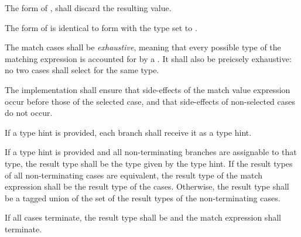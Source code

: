 \specsubsubitem
The \terminal{\_} form of , shall discard the resulting value.

\specsubsubitem
The  form of  is identical to
\terminal{\_} \terminal{:}  form with the type set to
.

\specsubsubitem
The match cases shall be \textit{exhaustive}, meaning that every possible type
of the matching expression is accounted for by a . It
shall also be preicsely exhaustive: no two cases shall select for the same
type.

\specsubsubitem
The implementation shall ensure that side-effects of the match value
expression occur before those of the selected case, and that side-effects of
non-selected cases do not occur.

\specsubsubitem
If a type hint is provided, each branch shall receive it as a type hint.

\specsubsubitem
If a type hint is provided and all non-terminating branches are assignable to
that type, the result type shall be the type given by the type hint. If the
result types of all non-terminating cases are equivalent, the result type of
the match expression shall be the result type of the cases. Otherwise, the
result type shall be a tagged union of the set of the result types of the
non-terminating cases.

If all cases terminate, the result type shall be  and the match
expression shall terminate.


\begin{grammar}
 \\
	   \\
	\terminal{*}    \\
	 \terminal{=}  \\

 \oneof \\
	\terminal{=}
	\terminal{+=}
	\terminal{-=}
	\terminal{*=}
	\terminal{/=}
	\terminal{\%=}
	\terminal{\textless{}\textless{}=}
	\terminal{\textgreater{}\textgreater{}=}
	\terminal{\&=}
	\terminal{|=}
	\terminal{\textasciicircum=}
\end{grammar}

